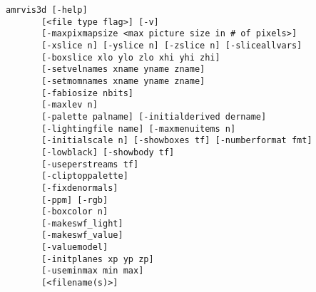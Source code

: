 \documentclass{article}
\begin{document}
\begin{verbatim}
amrvis3d [-help]
       [<file type flag>] [-v]
       [-maxpixmapsize <max picture size in # of pixels>]
       [-xslice n] [-yslice n] [-zslice n] [-sliceallvars]
       [-boxslice xlo ylo zlo xhi yhi zhi]
       [-setvelnames xname yname zname]
       [-setmomnames xname yname zname]
       [-fabiosize nbits]
       [-maxlev n]
       [-palette palname] [-initialderived dername]
       [-lightingfile name] [-maxmenuitems n]
       [-initialscale n] [-showboxes tf] [-numberformat fmt]
       [-lowblack] [-showbody tf]
       [-useperstreams tf]
       [-cliptoppalette]
       [-fixdenormals]
       [-ppm] [-rgb]
       [-boxcolor n]
       [-makeswf_light]
       [-makeswf_value]
       [-valuemodel]
       [-initplanes xp yp zp]
       [-useminmax min max]
       [<filename(s)>]


\end{verbatim}
\end{document}

